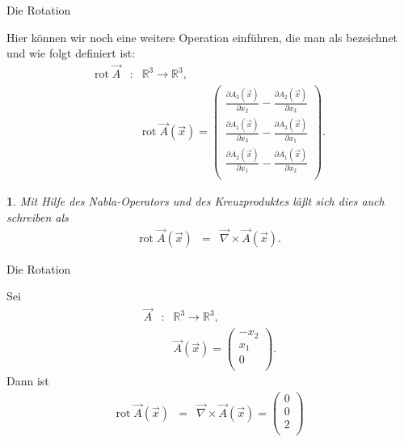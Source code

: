 \documentclass[german]{beamer}
\newcommand{\bq}{\begin{eqnarray*}}
\newcommand{\eq}{\end{eqnarray*}}
\newcommand{\superalert}[1]{{\color{MyYellowOrange}{#1}}}
\newtheorem*{myemptytheorem}{}
\begin{document}
\begin{frame}{Die Rotation}

\begin{definition}
Hier k\"onnen wir noch eine weitere Operation einf\"uhren, die man als \superalert{Rotation} bezeichnet und wie
folgt definiert ist:
\bq
 \mbox{rot} \; \vec{A} & : & {\mathbb R}^3 \rightarrow {\mathbb R}^3,
 \nonumber \\
 & &\mbox{rot} \; \vec{A}\left(\vec{x}\right) =
    \left( \begin{array}{c}
      \frac{\partial A_3\left(\vec{x}\right)}{\partial x_2} - \frac{\partial A_2\left(\vec{x}\right)}{\partial x_3} \\
      \frac{\partial A_1\left(\vec{x}\right)}{\partial x_3} - \frac{\partial A_3\left(\vec{x}\right)}{\partial x_1} \\
      \frac{\partial A_2\left(\vec{x}\right)}{\partial x_1} - \frac{\partial A_1\left(\vec{x}\right)}{\partial x_2} \\
           \end{array}
    \right).
\eq
\end{definition}
\begin{myemptytheorem}
Mit Hilfe des Nabla-Operators und des Kreuzproduktes l\"a{\ss}t sich dies auch schreiben als
\bq
 \mbox{rot} \; \vec{A}\left(\vec{x}\right) & = & \vec{\nabla} \times \vec{A}\left(\vec{x}\right).
\eq
\end{myemptytheorem}

\end{frame}

\begin{frame}{Die Rotation}

\begin{example}
Sei
\bq
 \vec{A} & : & {\mathbb R}^3 \rightarrow {\mathbb R}^3,
 \nonumber \\
 & & \vec{A}\left(\vec{x}\right) =
     \left( \begin{array}{c} -x_2 \\ x_1 \\ 0 \\ \end{array} \right).
\eq
Dann ist
\bq
 \mbox{rot} \; \vec{A}\left(\vec{x}\right) & = & \vec{\nabla} \times \vec{A}\left(\vec{x}\right)
 = \left( \begin{array}{c}
    0 \\ 0 \\ 2 \\
   \end{array} \right)
\eq
\end{example}

\end{frame}
\end{document}
